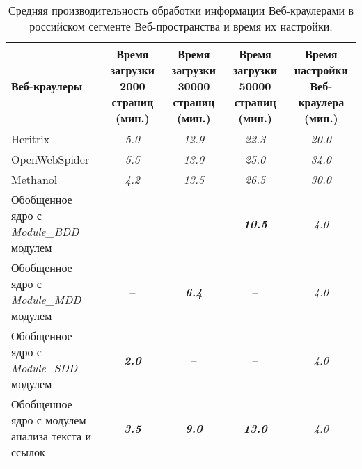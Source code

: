 \begin{table} [htbp]%
	\centering
	\caption{Средняя производительность обработки информации Веб-краулерами в российском сегменте Веб-пространства и время их настройки.}%
	\label{tab:crawlersRussian}%
	\renewcommand{\arraystretch}{1.5}%
	\begin{SingleSpace}
		\begin{tabulary}{\textwidth}{@{}>{\zz}L >{\zz}C >{\zz}C >{\zz}C >{\zz}C@{}}%
			\toprule     %
			Веб-краулеры & Время загрузки 2000 страниц (мин.) & Время загрузки 30000 страниц (мин.) & Время загрузки 50000 страниц (мин.) & Время настройки Веб-краулера (мин.) \\
			\midrule %
			Heritrix & \textit{5.0} & \textit{12.9} & \textit{22.3} & \textit{20.0} \\				
			OpenWebSpider & \textit{5.5} & \textit{13.0} & \textit{25.0} & \textit{34.0} \\
			Methanol & \textit{4.2} & \textit{13.5} & \textit{26.5} & \textit{30.0} \\			
			Обобщенное ядро с \textit{Module\_BDD} модулем & -- & -- & \textbf{\textit{10.5}} & \textit{4.0}\\
			Обобщенное ядро с \textit{Module\_MDD} модулем & -- & \textbf{\textit{6.4}} & -- & \textit{4.0}\\			
			Обобщенное ядро с \textit{Module\_SDD} модулем & \textbf{\textit{2.0}} & -- & -- & \textit{4.0}\\		
			Обобщенное ядро с модулем анализа текста и ссылок & \textbf{\textit{3.5}} & \textbf{\textit{9.0}} & \textbf{\textit{13.0}} & \textit{4.0}\\		
			\bottomrule %
		\end{tabulary}%
	\end{SingleSpace}
\end{table}

